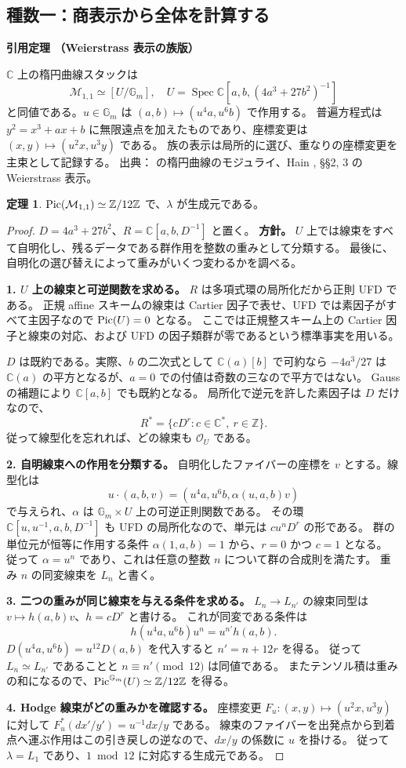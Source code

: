 \documentclass[dvipdfmx,a4paper,11pt]{article}
\theoremstyle{definition}
\newtheorem{thm}{定理}[section]
\newcommand{\C}{\mathbb C}\newcommand{\R}{\mathbb R}\newcommand{\Z}{\mathbb Z}\newcommand{\Q}{\mathbb Q}
\newcommand{\OO}{\mathcal O}\newcommand{\MM}{\mathcal M}\newcommand{\TT}{\mathcal T}
\DeclareMathOperator{\Spec}{Spec}\DeclareMathOperator{\Proj}{Proj}\DeclareMathOperator{\GL}{GL}
\newenvironment{external}[1]{\Needspace{7\baselineskip}\refstepcounter{thm}\begin{tcolorbox}[mybox,colback=blue!2,colframe=blue!40!black]\textbf{引用定理 \thethm（#1）}\par}{\end{tcolorbox}}
\begin{document}
\subsection{種数一：商表示から全体を計算する}
\begin{external}{Weierstrass 表示の族版}\label{input:weierstrass}
$\C$ 上の楕円曲線スタックは
\[
\MM_{1,1}\simeq[U/\mathbb G_m],\quad
U=\Spec\C[a,b,(4a^3+27b^2)^{-1}]
\]
と同値である。$u\in\mathbb G_m$ は $(a,b)\mapsto(u^4a,u^6b)$ で作用する。
普遍方程式は $y^2=x^3+ax+b$ に無限遠点を加えたものであり、座標変更は $(x,y)\mapsto(u^2x,u^3y)$ である。
族の表示は局所的に選び、重なりの座標変更を主束として記録する。
出典：\cite{HM} の楕円曲線のモジュライ、Hain \cite{Hain}, \S\S2, 3 の Weierstrass 表示。
\end{external}
\begin{thm}\label{thm:pic1}
$\Pic(\MM_{1,1})\simeq\Z/12\Z$ で、$\lambda$ が生成元である。
\end{thm}
\begin{proof}
$D=4a^3+27b^2$、$R=\C[a,b,D^{-1}]$ と置く。
\textbf{方針。} $U$ 上では線束をすべて自明化し、残るデータである群作用を整数の重みとして分類する。
最後に、自明化の選び替えによって重みがいくつ変わるかを調べる。

\textbf{1. $U$ 上の線束と可逆関数を求める。}
$R$ は多項式環の局所化だから正則 UFD である。
正規 affine スキームの線束は Cartier 因子で表せ、UFD では素因子がすべて主因子なので $\operatorname{Pic}(U)=0$ となる。
ここでは正規整スキーム上の Cartier 因子と線束の対応、および UFD の因子類群が零であるという標準事実を用いる。

$D$ は既約である。実際、$b$ の二次式として $\C(a)[b]$ で可約なら $-4a^3/27$ は $\C(a)$ の平方となるが、$a=0$ での付値は奇数の三なので平方ではない。
Gauss の補題により $\C[a,b]$ でも既約となる。
局所化で逆元を許した素因子は $D$ だけなので、
\[
R^*=\{cD^r:c\in\C^*,\ r\in\Z\}.
\]
従って線型化を忘れれば、どの線束も $\OO_U$ である。

\textbf{2. 自明線束への作用を分類する。}
自明化したファイバーの座標を $v$ とする。線型化は
\[
u\cdot(a,b,v)=(u^4a,u^6b,\alpha(u,a,b)v)
\]
で与えられ、$\alpha$ は $\mathbb G_m\times U$ 上の可逆正則関数である。
その環 $\C[u,u^{-1},a,b,D^{-1}]$ も UFD の局所化なので、単元は $cu^nD^r$ の形である。
群の単位元が恒等に作用する条件 $\alpha(1,a,b)=1$ から、$r=0$ かつ $c=1$ となる。
従って $\alpha=u^n$ であり、これは任意の整数 $n$ について群の合成則を満たす。
重み $n$ の同変線束を $L_n$ と書く。

\textbf{3. 二つの重みが同じ線束を与える条件を求める。}
$L_n\to L_{n'}$ の線束同型は $v\mapsto h(a,b)v$、$h=cD^r$ と書ける。
これが同変である条件は
\[
h(u^4a,u^6b)u^n=u^{n'}h(a,b).
\]
$D(u^4a,u^6b)=u^{12}D(a,b)$ を代入すると $n'=n+12r$ を得る。
従って $L_n\simeq L_{n'}$ であることと $n\equiv n'\pmod{12}$ は同値である。
またテンソル積は重みの和になるので、$\Pic^{\mathbb G_m}(U)\simeq\Z/12\Z$ を得る。

\textbf{4. Hodge 線束がどの重みかを確認する。}
座標変更 $F_u:(x,y)\mapsto(u^2x,u^3y)$ に対して
$F_u^*(dx'/y')=u^{-1}dx/y$ である。
線束のファイバーを出発点から到着点へ運ぶ作用はこの引き戻しの逆なので、$dx/y$ の係数に $u$ を掛ける。
従って $\lambda=L_1$ であり、$1\bmod12$ に対応する生成元である。
\end{proof}
\end{document}
